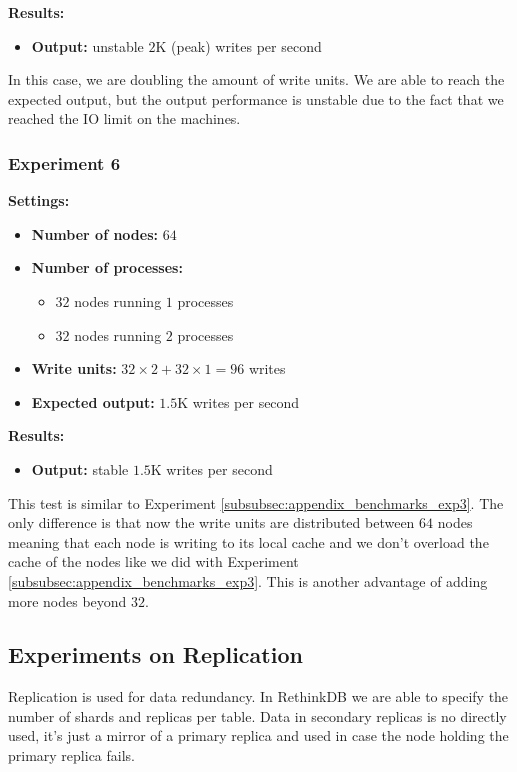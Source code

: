 \medskip
\noindent\textbf{Results:}
\begin{itemize}
 \item \textbf{Output:} unstable $2$K (peak) writes per second
\end{itemize}

In this case, we are doubling the amount of write units. 
We are able to reach the expected output, but the output performance is unstable due to the fact that we reached the IO limit on the machines. 

\subsubsection{Experiment 6}\label{subsubsec:appendix_benchmarks_exp6}
\medskip
\noindent\textbf{Settings:}
\begin{itemize}
 \item \textbf{Number of nodes:} $64$
 \item \textbf{Number of processes:}
 \begin{itemize}
  \item$32$ nodes running $1$ processes
  \item$32$ nodes running $2$ processes
 \end{itemize}
 \item \textbf{Write units:} $32 \times 2 + 32 \times 1 = 96$ writes
 \item \textbf{Expected output:} $1.5$K writes per second
\end{itemize}

\medskip
\noindent\textbf{Results:}
\begin{itemize}
 \item \textbf{Output:} stable $1.5$K writes per second
\end{itemize}

This test is similar to Experiment \ref{subsubsec:appendix_benchmarks_exp3}. 
The only difference is that now the write units are distributed between $64$ nodes meaning that each node is writing to its local cache and we don't overload the cache of the nodes like we did with Experiment \ref{subsubsec:appendix_benchmarks_exp3}. 
This is another advantage of adding more nodes beyond $32$.

\subsection{Experiments on Replication}

Replication is used for data redundancy.
In RethinkDB we are able to specify the number of shards and replicas per table.
Data in secondary replicas is no directly used, it’s just a mirror of a primary replica and used in case the node holding the primary replica fails.

